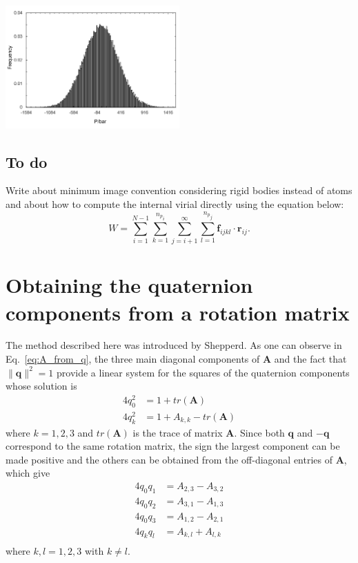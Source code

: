 \documentclass[aip,jcp,reprint,amsmath,amssymb,amsfont]{revtex4-1}
\newcommand{\mt}[1]{\boldsymbol{\mathbf{#1}}}           %
\newcommand{\vt}[1]{\boldsymbol{\mathbf{#1}}}           %
\begin{document}
\begin{center}
\label{fig:pressure}
\includegraphics[width=0.5\textwidth,keepaspectratio]{FiguraAna}
\end{center}

\subsection{To do}

Write about minimum image convention considering rigid bodies instead of atoms and about how to compute the internal virial directly using the equation below:
\[
W = \sum_{i=1}^{N-1} \sum_{k=1}^{{n_p}_i} \sum_{j=i+1}^{\infty} \sum_{l=1}^{{n_p}_j} {\vt f}_{ijkl} \cdot {\vt r}_{ij}.
\]

\appendix

\section{\label{sec:quat_from_A}Obtaining the quaternion components from a rotation matrix}

The method described here was introduced by Shepperd.\cite{Shepperd1978} As one can observe in Eq.~\ref{eq:A_from_q}, the three main diagonal components of $\mt A$ and the fact that $\lVert \vt q \lVert^2 = 1$ provide a linear system for the squares of the quaternion components whose solution is
\begin{align*}
4 q_0^2 &= 1 + tr(\mt A) \\
4 q_k^2 &= 1 + A_{k,k} - tr(\mt A)
\end{align*}
where $k = 1,2,3$ and $tr(\mt A)$ is the trace of matrix $\mt A$. Since both $\vt q$ and $- \vt q$ correspond to the same rotation matrix, the sign the largest component\cite{Shepperd1978} can be made positive and the others can be obtained from the off-diagonal entries of $\mt A$, which give
\begin{align*}
4 q_0 q_1 &= A_{2,3} - A_{3,2} \\
4 q_0 q_2 &= A_{3,1} - A_{1,3} \\
4 q_0 q_3 &= A_{1,2} - A_{2,1} \\
4 q_k q_l &= A_{k,l} + A_{l,k} \\
\end{align*}
where $k,l = 1,2,3$ with $k \neq l$.
\end{document}
